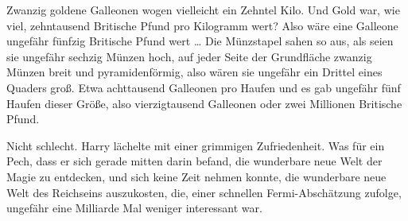 Zwanzig goldene Galleonen wogen vielleicht ein Zehntel Kilo. Und Gold war, wie viel, zehntausend Britische Pfund pro Kilogramm wert? Also wäre eine Galleone ungefähr fünfzig Britische Pfund wert … Die Münzstapel sahen so aus, als seien sie ungefähr sechzig Münzen hoch, auf jeder Seite der Grundfläche zwanzig Münzen breit und pyramidenförmig, also wären sie ungefähr ein Drittel eines Quaders groß. Etwa achttausend Galleonen pro Haufen und es gab ungefähr fünf Haufen dieser Größe, also vierzigtausend Galleonen oder zwei Millionen Britische Pfund.

Nicht schlecht. Harry lächelte mit einer grimmigen Zufriedenheit. Was für ein Pech, dass er sich gerade mitten darin befand, die wunderbare neue Welt der Magie zu entdecken, und sich keine Zeit nehmen konnte, die wunderbare neue Welt des Reichseins auszukosten, die, einer schnellen Fermi-Abschätzung zufolge, ungefähr eine Milliarde Mal weniger interessant war.

